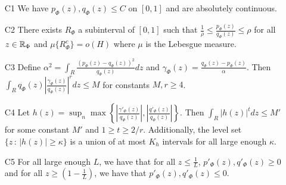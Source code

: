 \documentclass{article}
\begin{document}
\begin{proposition}
\begin{enumerate}
\item[C1] We have $p_\Phi(z), q_\Phi(z) \leq C$ on $[0,1]$ and are absolutely continuous.
\item[C2] There exists $R_\Phi$ a subinterval of $[0,1]$ such that $\frac{1}{\rho} \leq \frac{p_\Phi(z)}{q_\Phi(z)} \leq \rho$ for all $z \in {\mathbb R}_\Phi$ and $\mu\{R_\Phi^c\} = o(H)$ where $\mu$ is the Lebesgue measure.
\item[C3] Define $\alpha^2 = \int_R \frac{(p_\Phi(z) - q_\Phi(z))^2}{q_\Phi(z)} dz$ and $\gamma_\Phi(z) = \frac{q_\Phi(z) - p_\Phi(z)}{\alpha}$. Then $\int_R q_\Phi(z) \left| \frac{\gamma_\Phi(z)}{q_\Phi(z)} \right|^r dz  \leq M$ for constants $M, r \geq 4$.
\item[C4] Let $h(z) = \sup_n \max \left\{  \left|\frac{\gamma'_\Phi(z)}{q_\Phi(z)} \right|, 
 \left|\frac{q'_\Phi(z)}{q_\Phi(z)}\right|  \right\} $. Then $\int_R |h(z)|^t dz \leq M'$ for some constant $M'$ and $1 \geq t \geq 2/r$. Additionally, the level set $\{z \,:\, |h(z)| \geq \kappa\}$ is a union of at most $K_h$ intervals for all large enough $\kappa$.  
\item[C5] For all large enough $L$, we have that for all $z \leq \frac{1}{L}$, $p'_\Phi(z), q'_\Phi(z) \geq 0$ and for all $z \geq (1 - \frac{1}{L})$, we have that $p'_\Phi(z), q'_\Phi(z) \leq 0$.
\end{enumerate}

\end{proposition}
\end{document}

